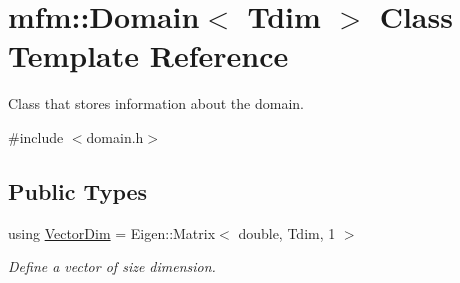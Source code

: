 \hypertarget{classmfm_1_1_domain}{}\section{mfm\+:\+:Domain$<$ Tdim $>$ Class Template Reference}
\label{classmfm_1_1_domain}


Class that stores information about the domain.  




{\ttfamily \#include $<$domain.\+h$>$}

\subsection*{Public Types}
\begin{DoxyCompactItemize}
\item 
\mbox{\label{classmfm_1_1_domain_a80581ccb1f293da341c2edbe528c26fc}} 
using \hyperlink{classmfm_1_1_domain_a80581ccb1f293da341c2edbe528c26fc}{Vector\+Dim} = Eigen\+::\+Matrix$<$ double, Tdim, 1 $>$
\begin{DoxyCompactList}\small\item\em Define a vector of size dimension. \end{DoxyCompactList}\end{DoxyCompactItemize}
